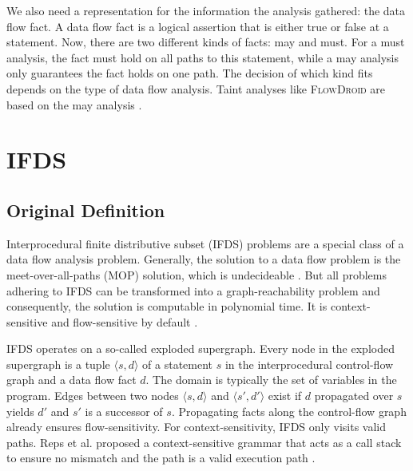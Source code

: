 \documentclass[../draft.tex]{subfiles}
\begin{document}
    We also need a representation for the information the analysis gathered: the data flow fact. A data flow fact is a logical assertion that is either true or false at a statement. Now, there are two different kinds of facts: may and must. For a must analysis, the fact must hold on all paths to this statement, while a may analysis only guarantees the fact holds on one path. The decision of which kind fits depends on the type of data flow analysis. Taint analyses like \textsc{FlowDroid} are based on the may analysis \cite{Arzt2017PhD}.
    



    \section{IFDS}
    \subsection{Original Definition}\label{s:ifds}
    Interprocedural finite distributive subset (IFDS) problems are a special class of a data flow analysis problem. Generally, the solution to a data flow problem is the meet-over-all-paths (MOP) solution, which is undecideable \cite{Rice1953}. But all problems adhering to IFDS can be transformed into a graph-reachability problem and consequently, the solution is computable in polynomial time. It is context-sensitive and flow-sensitive by default \cite{Reps1995}.

    IFDS operates on a so-called exploded supergraph. Every node in the exploded supergraph is a tuple $\langle s, d \rangle$ of a statement $s$ in the interprocedural control-flow graph and a data flow fact $d$. The domain is typically the set of variables in the program. Edges between two nodes $\langle s, d \rangle$ and $\langle s', d' \rangle$ exist if $d$ propagated over $s$ yields $d'$ and $s'$ is a successor of $s$. Propagating facts along the control-flow graph already ensures flow-sensitivity.
    For context-sensitivity, IFDS only visits valid paths. Reps et al. proposed a context-sensitive grammar that acts as a call stack to ensure no mismatch and the path is a valid execution path \cite{Reps1995}.
\end{document}
